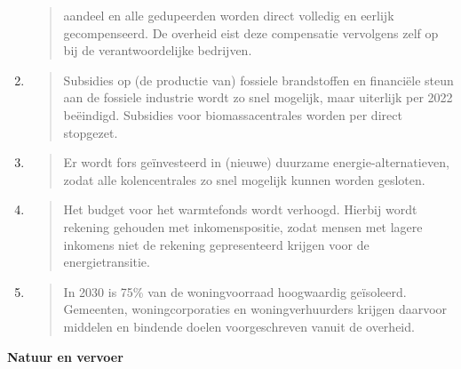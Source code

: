 \begin{enumerate}
\begin{quote}
  aandeel en alle gedupeerden worden direct volledig en eerlijk
  gecompenseerd. De overheid eist deze compensatie vervolgens zelf op
  bij de verantwoordelijke bedrijven.
  \end{quote}
\item
  \begin{quote}
  Subsidies op (de productie van) fossiele brandstoffen en financiële
  steun aan de fossiele industrie wordt zo snel mogelijk, maar uiterlijk
  per 2022 beëindigd. Subsidies voor biomassacentrales worden per direct
  stopgezet.
  \end{quote}
\item
  \begin{quote}
  Er wordt fors geïnvesteerd in (nieuwe) duurzame energie-alternatieven,
  zodat alle kolencentrales zo snel mogelijk kunnen worden gesloten.
  \end{quote}
\item
  \begin{quote}
  Het budget voor het warmtefonds wordt verhoogd. Hierbij wordt rekening
  gehouden met inkomenspositie, zodat mensen met lagere inkomens niet de
  rekening gepresenteerd krijgen voor de energietransitie.
  \end{quote}
\item
  \begin{quote}
  In 2030 is 75\% van de woningvoorraad hoogwaardig geïsoleerd.
  Gemeenten, woningcorporaties en woningverhuurders krijgen daarvoor
  middelen en bindende doelen voorgeschreven vanuit de overheid.
  \end{quote}
\end{enumerate}

\textbf{Natuur en vervoer}

